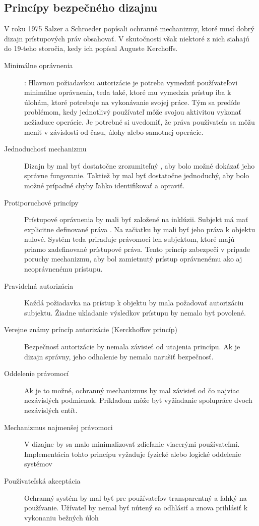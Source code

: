 \subsection{Princípy bezpečného dizajnu}
\label{sec:bezpecny dizajn}
V roku 1975 Salzer a Schroeder \cite{saltzer} popísali ochranné mechanizmy, ktoré musí dobrý dizajn prístupových práv obsahovať. V skutočnosti však niektoré z nich siahajú do 19-teho storočia, kedy ich popísal Auguste Kerchoffs. 

\begin{description}
	\item[Minimálne oprávnenia] : Hlavnou požiadavkou autorizácie je potreba vymedziť používateľovi minimálne oprávnenia, teda také, ktoré mu vymedzia prístup iba k úlohám, ktoré potrebuje na vykonávanie svojej práce. Tým sa predíde problémom, kedy jednotlivý používateľ môže svojou aktivitou vykonať nežiaduce operácie. Je potrebné si uvedomiť, že práva používateľa sa môžu meniť v závislosti od  času, úlohy alebo samotnej operácie. 
	\item[Jednoduchosť mechanizmu] Dizajn by mal byť dostatočne zrozumiteľný , aby bolo možné dokázať jeho správne fungovanie. Taktiež by mal byť dostatočne jednoduchý, aby  bolo možné prípadné chyby ľahko identifikovať a opraviť.
	\item[Protiporuchové princípy] Prístupové oprávnenia by mali byť založené na inklúzii. Subjekt má mať explicitne definované práva . Na začiatku by mali byť jeho práva k objektu nulové. Systém teda priraďuje právomoci len subjektom, ktoré majú priamo zadefinované prístupové práva. Tento princíp zabezpečí v prípade poruchy mechanizmu, aby bol zamietnutý prístup oprávnenému ako aj neoprávnenému prístupu. 
	\item[Pravidelná autorizácia] Každá požiadavka na prístup k objektu by mala požadovať autorizáciu subjektu. Žiadne ukladanie výsledkov prístupu by nemalo byť povolené.
	\item[Verejne známy príncíp autorizácie (Kerckhoffov princíp)] Bezpečnosť autorizácie by nemala závisieť od utajenia princípu. Ak je dizajn správny, jeho odhalenie by nemalo narušiť bezpečnosť.
	\item[Oddelenie právomocí] Ak je to možné, ochranný mechanizmus by mal závisieť od čo najviac nezávislých podmienok. Príkladom môže byť vyžiadanie spolupráce dvoch nezávislých entít. 
	\item[Mechanizmus najmenšej právomoci] V dizajne by sa malo minimalizovať zdieľanie viacerými používateľmi. Implementácia tohto princípu vyžaduje fyzické alebo logické oddelenie systémov
	\item[Používateľská akceptácia] Ochranný systém by mal byť pre používateľov transparentný a ľahký na používanie. Užívateľ by nemal byť nútený sa odhlásiť a znova prihlásiť k vykonaniu bežných úloh
\end{description}



